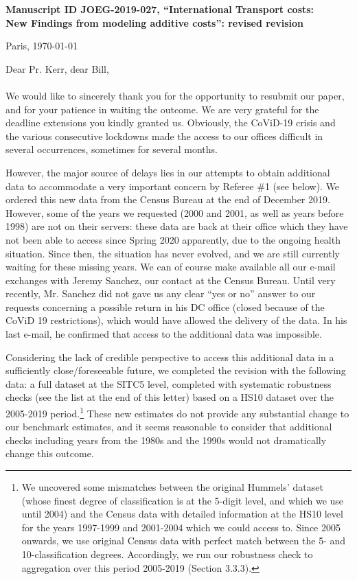 \documentclass[12pt]{article}
\begin{document}
\noindent \textbf{Manuscript ID JOEG-2019-027, ``International Transport costs:\\New Findings from modeling additive costs'': revised revision}

\bigskip
\bigskip

\hfill Paris, \today

\bigskip
\noindent Dear Pr. Kerr, dear Bill, \\
\\
\noindent \noindent We would like to sincerely thank you for the opportunity to resubmit our paper, and for your patience in waiting the outcome. We are very grateful for the deadline extensions you kindly granted us. Obviously, the CoViD-19 crisis and the various consecutive lockdowns made the access to our offices difficult in several occurrences, sometimes for several months. \medskip

However, the major source of delays lies in our attempts to obtain additional data to accommodate a very important concern by Referee \#1 (see below). We ordered this new data from the Census Bureau at the end of December 2019. However, some of the years we requested (2000 and 2001, as well as years before 1998) are not on their servers: these data are back at their office which they have not been able to access since Spring 2020 apparently, due to the ongoing health situation. Since then, the situation has never evolved, and we are still currently waiting for these missing years. We can of course make available all our e-mail exchanges with Jeremy Sanchez, our contact at the Census Bureau. Until very recently, Mr. Sanchez did not gave us any clear ``yes or no'' answer to our requests concerning a possible return in his DC office (closed because of the CoViD 19 restrictions), which would have allowed the delivery of the data. In his last e-mail, he confirmed that access to the additional data was impossible.\medskip

Considering the lack of credible perspective to access this additional data in a sufficiently close/foreseeable future, we completed the revision with the following data: a full dataset at the SITC5 level, completed with systematic robustness checks (see the list at the end of this letter) based on a HS10 dataset over the 2005-2019 period.\footnote{We uncovered some mismatches between the original Hummels' dataset (whose finest degree of classification is at the 5-digit level, and which we use until 2004) and the Census data with detailed information at the HS10 level for the years 1997-1999 and 2001-2004 which we could access to. Since 2005 onwards, we use original Census data with perfect match between the 5- and 10-classification degrees. Accordingly, we run our robustness check to aggregation over this period 2005-2019 (Section 3.3.3).} These new estimates do not provide any substantial change to our benchmark estimates, and it seems reasonable to consider that additional checks including years from the 1980s and the 1990s would not dramatically change this outcome. \medskip
\end{document}
